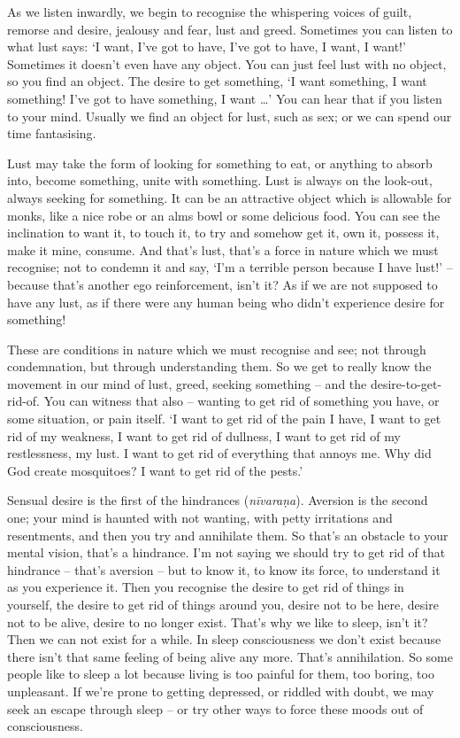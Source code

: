 
As we listen inwardly, we begin to recognise the whispering voices of guilt, remorse and desire, jealousy and fear, lust and greed. Sometimes you can listen to what lust says: `I want, I've got to have, I've got to have, I want, I want!' Sometimes it doesn't even have any object. You can just feel lust with no object, so you find an object. The desire to get something, `I want something, I want something! I've got to have something, I want \ldots{}' You can hear that if you listen to your mind. Usually we find an object for lust, such as sex; or we can spend our time fantasising.

Lust may take the form of looking for something to eat, or anything to absorb into, become something, unite with something. Lust is always on the look-out, always seeking for something. It can be an attractive object which is allowable for monks, like a nice robe or an alms bowl or some delicious food. You can see the inclination to want it, to touch it, to try and somehow get it, own it, possess it, make it mine, consume. And that's lust, that's a force in nature which we must recognise; not to condemn it and say, `I'm a terrible person because I have lust!' -- because that's another ego reinforcement, isn't it? As if we are not supposed to have any lust, as if there were any human being who didn't experience desire for something!

These are conditions in nature which we must recognise and see; not through condemnation, but through understanding them. So we get to really know the movement in our mind of lust, greed, seeking something -- and the desire-to-get-rid-of. You can witness that also -- wanting to get rid of something you have, or some situation, or pain itself. `I want to get rid of the pain I have, I want to get rid of my weakness, I want to get rid of dullness, I want to get rid of my restlessness, my lust. I want to get rid of everything that annoys me. Why did God create mosquitoes? I want to get rid of the pests.'

Sensual desire is the first of the hindrances (\textit{nīvaraṇa}). Aversion is the second one; your mind is haunted with not wanting, with petty irritations and resentments, and then you try and annihilate them. So that's an obstacle to your mental vision, that's a hindrance. I'm not saying we should try to get rid of that hindrance -- that's aversion -- but to know it, to know its force, to understand it as you experience it. Then you recognise the desire to get rid of things in yourself, the desire to get rid of things around you, desire not to be here, desire not to be alive, desire to no longer exist. That's why we like to sleep, isn't it? Then we can not exist for a while. In sleep consciousness we don't exist because there isn't that same feeling of being alive any more. That's annihilation. So some people like to sleep a lot because living is too painful for them, too boring, too unpleasant. If we're prone to getting depressed, or riddled with doubt, we may seek an escape through sleep -- or try other ways to force these moods out of consciousness.

